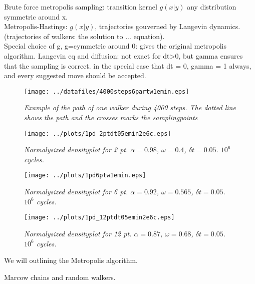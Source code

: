 \documentclass[a4paper,10pt,twocolumn]{article} %
\begin{document}
Brute force metropolis sampling: transition kernel $g(x|y)$ any distribution symmetric around x.\\
Metropolis-Hastings: $g(x|y)$, trajectories gouverned by Langevin dynamics. (trajectories of walkers: the solution to 
... equation).\\

Special choice of g, g=cymmetric around 0: gives the original metropolis algorithm.
Langevin eq and diffusion: not exact for dt>0, but gamma ensures that the sampling is correct. in the special case that 
dt = 0, gamma = 1 always, and every suggested move should be accepted. 


\begin{figure}[h]
\begin{center}
	\texttt{[image: ../datafiles/4000steps6partw1emin.eps]}
\end{center}
\caption{{\it\small Example of the path of one walker during 4000 steps. The dotted line shows the path and the crosses 
marks the samplingpoints}}
\end{figure}

\begin{figure}[h]
\begin{center}
	\texttt{[image: ../plots/1pd\_2ptdt05emin2e6c.eps]}
\end{center}
\caption{{\it\small Normalysized densityplot for 2 pt. $\alpha=0.98$, $\omega=0.4$, $\delta t=0.05$. $10^6$ cycles. }}

\begin{center}
	\texttt{[image: ../plots/1pd6ptw1emin.eps]}
\end{center}
\caption{{\it\small Normalysized densityplot for 6 pt. $\alpha=0.92$, $\omega=0.565$, $\delta t=0.05$. $10^6$ cycles. }}

\begin{center}
	\texttt{[image: ../plots/1pd\_12ptdt05emin2e6c.eps]}
\end{center}
\caption{{\it\small Normalysized densityplot for 12 pt. $\alpha=0.87$, $\omega=0.68$, $\delta t=0.05$. $10^6$ cycles. }}
\end{figure}
We will outlining the Metropolis algorithm.

Marcow chains and random walkers.
\end{document}
